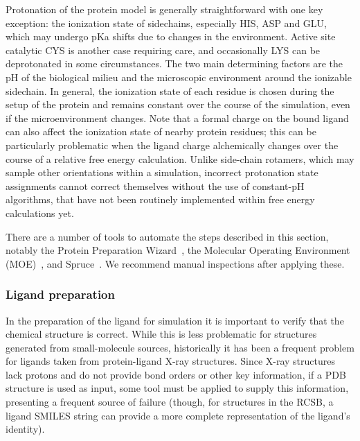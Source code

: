 \documentclass[9pt,bestpractices]{livecoms}
\begin{document}
Protonation of the protein model is generally straightforward with one key exception: the ionization state of sidechains, especially HIS, ASP and GLU, which may undergo pKa shifts due to changes in the environment. Active site catalytic CYS is another case requiring care, and occasionally LYS can be deprotonated in some circumstances. The two main determining factors are the pH of the biological milieu and the microscopic environment around the ionizable sidechain. In general, the ionization state of each residue is chosen during the setup of the protein and remains constant over the course of the simulation, even if the microenvironment changes. 
Note that a formal charge on the bound ligand can also affect the ionization state of nearby protein residues; this can be particularly problematic when the ligand charge alchemically changes over the course of a relative free energy calculation. Unlike side-chain rotamers, which may sample other orientations within a simulation, incorrect protonation state assignments cannot correct themselves without the use of constant-pH algorithms, that have not been routinely implemented within free energy calculations yet. 

There are a number of tools to automate the steps described in this section, notably the Protein Preparation Wizard~\cite{madhavisastry_protein_2013}, the Molecular Operating Environment (MOE)~\cite{moe_2021}, and Spruce~\cite{openeye_spruce}. We recommend manual inspections after applying these.

\subsubsection{Ligand preparation}
\label{sec:ligprep}

In the preparation of the ligand for simulation it is important to verify that the chemical structure is correct. While this is less problematic for structures generated from small-molecule sources, historically it has been a frequent problem for ligands taken from protein-ligand X-ray structures. Since X-ray structures lack protons and do not provide bond orders or other key information, if a PDB structure is used as input, some tool must be applied to supply this information, presenting a frequent source of failure (though, for structures in the RCSB, a ligand SMILES string can provide a more complete representation of the ligand's identity).
\end{document}

